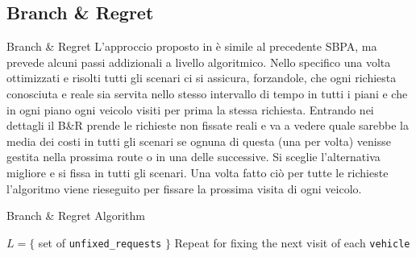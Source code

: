 \documentclass[10pt]{beamer}
\begin{document}
    \subsection{Branch \& Regret}\label{sec:b-and-r}
    \begin{frame}{Branch \& Regret}
        L'approccio proposto in \textcite{BRH} è simile al precedente SBPA, ma prevede alcuni passi addizionali a livello algoritmico. Nello specifico una volta ottimizzati e risolti tutti gli scenari ci si assicura, forzandole, che ogni richiesta conosciuta e reale sia servita nello stesso intervallo di tempo in tutti i piani e che in ogni piano ogni veicolo visiti per prima la stessa richiesta.
        Entrando nei dettagli il B\&R prende le richieste non fissate reali e va a vedere quale sarebbe la media dei costi in tutti gli scenari se ognuna di questa (una per volta) venisse gestita nella prossima route o in una delle successive. Si sceglie l'alternativa migliore e si fissa in tutti gli scenari. Una volta fatto ciò per tutte le richieste l'algoritmo viene rieseguito per fissare la prossima visita di ogni veicolo. 
    \end{frame}

    \begin{frame}{Branch \& Regret Algorithm}
    \begin{algorithm}[H]
            \SetAlgoLined
            $L = \{$ set of \texttt{unfixed\_requests} $\}$\;
            Repeat for fixing the next visit of each \texttt{vehicle}\;
            \caption{Branch-and-Regret}
            \label{alg:BR}
        \end{algorithm}
        
    \end{frame}
\end{document}
